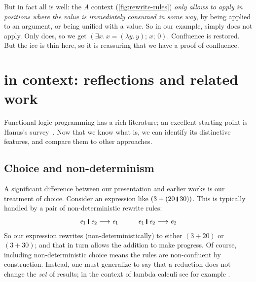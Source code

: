 \documentclass[acmsmall,review,anonymous,dvipsnames]{acmart}
\newcommand{\Conid}[1]{\mathit{#1}}
\newcommand{\Varid}[1]{\mathit{#1}}
\begin{document}
But in fact all is well: the \ensuremath{\Conid{A}} context (\cref{fig:rewrite-rules}) \emph{only
  allows  to apply in positions where the value is immediately
  consumed in some way}, by being applied to an argument, or being
unified with a value.  So in our example,  simply does not apply. Only  does,
so we get \ensuremath{(\exists\Varid{x}.\,\Varid{x}=(\lambda\Varid{y}.\,\Varid{y});\,\Varid{x};\,\mathrm{0})}.
Confluence is restored.
But the ice is thin here, so it is reassuring that we have a proof of confluence.


\section{\versecalc{} in context: reflections and related work} \label{sec:related}

Functional logic programming has a rich literature; an excellent
starting point is Hanus's survey~\cite{hanus:survey}.  Now that we
know what \versecalc{} is, we can identify its distinctive features,
and compare them to other approaches.

\subsection{Choice and non-determinism} \label{sec:deterministic}

A significant difference between our presentation and earlier works is our
treatment of choice. Consider an expression like \ensuremath{(\mathrm{3}\mathbin{+}(\mathrm{20}\;\rule[-0.3mm]{0.5mm}{2.5mm}\;\mathrm{30}))}.
This is typically handled by a pair of non-deterministic rewrite rules:
$$
\ensuremath{\Varid{e}_{\mathrm{1}}\;\rule[-0.3mm]{0.5mm}{2.5mm}\;\Varid{e}_{\mathrm{2}}} \movesto \ensuremath{\Varid{e}_{\mathrm{1}}} \hspace{1cm} \ensuremath{\Varid{e}_{\mathrm{1}}\;\rule[-0.3mm]{0.5mm}{2.5mm}\;\Varid{e}_{\mathrm{2}}} \movesto \ensuremath{\Varid{e}_{\mathrm{2}}}
$$
So our expression rewrites (non-deterministically) to either \ensuremath{(\mathrm{3}\mathbin{+}\mathrm{20})} or \ensuremath{(\mathrm{3}\mathbin{+}\mathrm{30})};
and that in turn allows the addition to make progress.
Of course, including non-deterministic choice means the rules are non-confluent by
construction.  Instead, one must generalize to say that a reduction does not change the
\emph{set} of results; in the context of lambda calculi see
for example \cite{schmidt-schauss:non-det1,schmidt-schauss:non-det2}.
\end{document}
